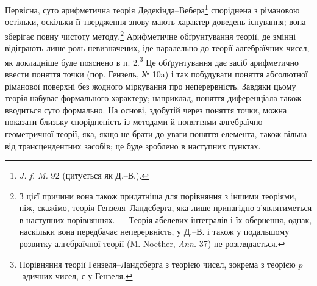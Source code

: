 \documentclass[11pt]{article}
\begin{document}
Первісна, суто арифметична теорія Дедекінда--Вебера\footnote{\emph{J. f. M.} 92 (цитується як Д.--В.).} споріднена з рімановою остільки, оскільки її твердження знову мають характер доведень існування; вона зберігає повну чистоту методу.\footnote{З цієї причини вона також придатніша для порівняння з іншими теоріями, ніж, скажімо, теорія Гензеля--Ландсберга, яка лише принагідно з'являтиметься в наступних порівняннях. --- Теорія абелевих інтегралів і їх обернення, однак, наскільки вона передбачає неперервність, у Д.--В. і також у подальшому розвитку алгебраїчної теорії (M. Noether, \emph{Ann.} 37) не розглядається.} Арифметичне обґрунтування теорії, де змінні відіграють лише роль невизначених, іде паралельно до теорії алгебраїчних чисел, як докладніше буде пояснено в п. 2.\footnote{Порівняння теорії Гензеля--Ландсберга з теорією чисел, зокрема з теорією \(p\)-адичних чисел, є у Гензеля.} Це обґрунтування дає засіб арифметично ввести поняття точки (пор. Гензель, № 10a) і так побудувати поняття абсолютної ріманової поверхні без жодного міркування про неперервність. Завдяки цьому теорія набуває формального характеру; наприклад, поняття диференціала також вводиться суто формально. На основі, здобутій через поняття точки, можна показати близьку спорідненість із методами й поняттями алгебраїчно-геометричної теорії, яка, якщо не брати до уваги поняття елемента, також вільна від трансцендентних засобів; це буде зроблено в наступних пунктах.
\end{document}
